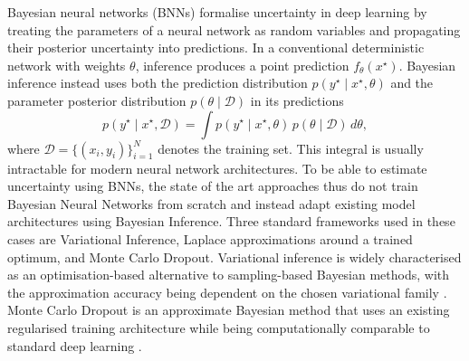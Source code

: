 Bayesian neural networks (BNNs) formalise uncertainty in deep learning by treating the parameters of a neural network as random variables and propagating their posterior uncertainty into predictions. In a conventional deterministic network with weights $\theta$, inference produces a point prediction $f_\theta(x^\star)$. Bayesian inference instead uses both the prediction distribution \(p\!\left(y^\star \mid x^\star, \theta\right)\) and the parameter posterior distribution \(p(\theta \mid \mathcal{D})\) in its predictions
\begin{equation}
p(y^\star \mid x^\star, \mathcal{D}) = \int p\!\left(y^\star \mid x^\star, \theta\right)\, p(\theta \mid \mathcal{D}) \, d\theta,
\end{equation}
where $\mathcal{D}=\{(x_i,y_i)\}_{i=1}^N$ denotes the training set. This integral is usually intractable for modern neural network architectures. To be able to estimate uncertainty using BNNs, the state of the art approaches thus do not train Bayesian Neural Networks from scratch and instead adapt existing model architectures using Bayesian Inference. Three standard frameworks used in these cases are Variational Inference, Laplace approximations around a trained optimum, and Monte Carlo Dropout. Variational inference is widely characterised as an optimisation-based alternative to sampling-based Bayesian methods, with the approximation accuracy being dependent on the chosen variational family \cite{Blei2018vi,Graves2011vi}. Monte Carlo Dropout is an approximate Bayesian method that uses an existing regularised training architecture while being computationally comparable to standard deep learning \cite{Gal2016Dropout}.

